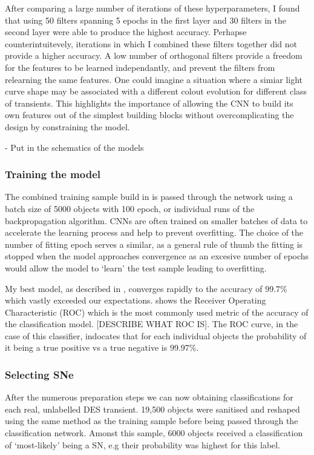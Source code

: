 After comparing a large number of iterations of these hyperparameters, I found that using 50 filters spanning 5 epochs in the first layer and 30 filters in the second layer were able to produce the highest accuracy. Perhapse counterintuitevely, iterations in which I combined these filters together did not provide a higher accuracy. A low number of orthogonal filters provide a freedom for the features to be learned independantly, and prevent the filters from relearning the same features. One could imagine a situation where a simiar light curve shape may be associated with a different colout evolution for different class of transients. This highlights the importance of allowing the CNN to build its own features out of the simplest building blocks without overcomplicating the design by constraining the model.

- Put in the schematics of the models

\subsubsection{Training the model}
The combined training sample build in  is passed through the network using a batch size of 5000 objects with 100 epoch, or individual runs of the backpropagation algorithm. CNNs are often trained on smaller batches of data to accelerate the learning process and help to prevent overfitting. The choice of the number of fitting epoch serves a similar, as a general rule of thumb the fitting is stopped when the model approaches convergence as an excesive number of epochs would allow the model to `learn' the test sample leading to overfitting.

My best model, as described in , converges rapidly to the accuracy of 99.7\% which vastly exceeded our expectations.  shows the Receiver Operating Characteristic (ROC) which is the most commonly used metric of the accuracy of the classification model. [DESCRIBE WHAT ROC IS]. The ROC curve, in the case of this classifier, indocates that for each individual objects the probability of it being a true positive vs a true negative is 99.97\%.

\begin{figure}
  \caption{}
  \label{fig:AGNNoiseROC}
\end{figure}

\subsubsection{Selecting SNe}
After the numerous preparation steps we can now obtaining classifications for each real, unlabelled DES transient. 19,500 objects were sanitised and reshaped using the same method as the training sample before being passed through the classification network. Amonst this sample, 6000 objects received a classification of `most-likely' being a SN, e.g their probability was highest for this label.


